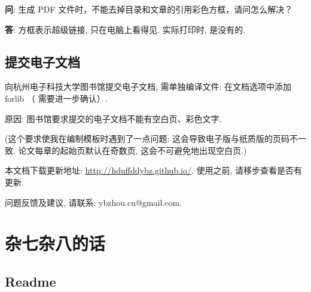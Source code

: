 \documentclass[forlib]{HDUMaster}   %
\begin{document}
\textbf{问}: {\kaishu 生成 PDF 文件时，不能去掉目录和文章的引用彩色方框，请问怎么解决？}

\textbf{答}: {\kaishu 方框表示超级链接, 只在电脑上看得见. 实际打印时, 是没有的.}





\section{提交电子文档}

向杭州电子科技大学图书馆提交电子文档, 需单独编译文件: 在文档选项中添加 forlib （ 需要进一步确认）.

原因: 图书馆要求提交的电子文档不能有空白页、彩色文字.

({\kaishu 这个要求使我在编制模板时遇到了一点问题: 这会导致电子版与纸质版的页码不一致.  论文每章的起始页默认在奇数页, 这会不可避免地出现空白页.})


本文档下载更新地址: \url{http://hduffddybz.github.io/}. 使用之前, 请移步查看是否有更新.

问题反馈及建议, 请联系: ybzhou.cn@gmail.com.




\chapter{杂七杂八的话}

\section{Readme}
\end{document}
